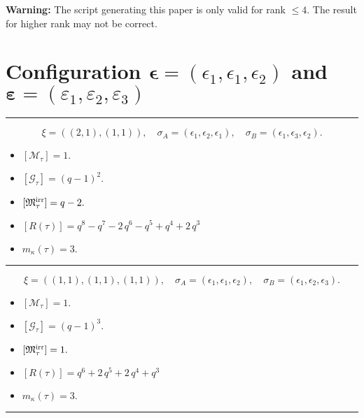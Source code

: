 \documentclass[10pt,a4paper]{amsart}
\begin{document}
\textbf{Warning: }The script generating this paper is only valid for rank $\leq 4$. The result for higher rank may not be correct.

\newpage{}


\section{Configuration $\bm{\epsilon} = (\epsilon_1,\epsilon_1,\epsilon_2)$ and $\bm{\varepsilon} =(\varepsilon_1,\varepsilon_2,\varepsilon_3)$}
\noindent\rule{8cm}{0.4pt}

$$\xi = ({(2, 1), (1, 1)}),\quad \sigma_A = ({{\epsilon_1, \epsilon_2}, {\epsilon_1}}),\quad \sigma_B = ({{\epsilon_1, \epsilon_3}, {\epsilon_2}}).$$

\begin{itemize}
 \item $[\mathcal{M}_{\tau}] = 1 .$

 \item $[\mathcal{G}_{\tau}] = {\left(q - 1\right)}^{2} .$

 \item $[{\frak M}_{\tau}^{\textrm{irr}}] = q - 2 .$

 \item $[R(\tau)] = q^{8} - q^{7} - 2 \, q^{6} - q^{5} + q^{4} + 2 \, q^{3} $

 \item $m_{\kappa}(\tau) = 3 .$

 \end{itemize}
\noindent\rule{8cm}{0.4pt}

$$\xi = ({(1, 1), (1, 1), (1, 1)}),\quad \sigma_A = ({{\epsilon_1}, {\epsilon_1}, {\epsilon_2}}),\quad \sigma_B = ({{\epsilon_1}, {\epsilon_2}, {\epsilon_3}}).$$

\begin{itemize}
 \item $[\mathcal{M}_{\tau}] = 1 .$

 \item $[\mathcal{G}_{\tau}] = {\left(q - 1\right)}^{3} .$

 \item $[{\frak M}_{\tau}^{\textrm{irr}}] = 1 .$

 \item $[R(\tau)] = q^{6} + 2 \, q^{5} + 2 \, q^{4} + q^{3} $

 \item $m_{\kappa}(\tau) = 3 .$

 \end{itemize}
\noindent\rule{8cm}{0.4pt}
\end{document}
